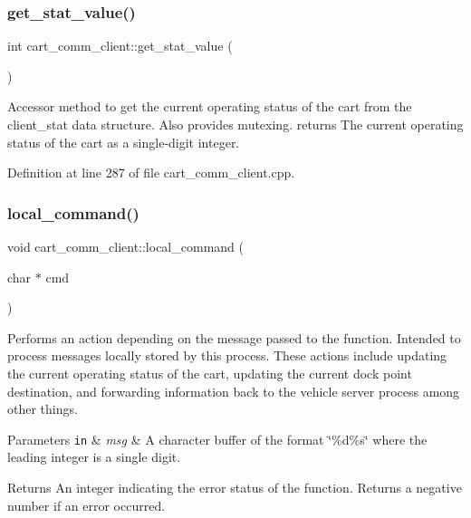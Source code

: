 \subsubsection{\texorpdfstring{get\+\_\+stat\+\_\+value()}{get\_stat\_value()}}
{\footnotesize\ttfamily int cart\+\_\+comm\+\_\+client\+::get\+\_\+stat\+\_\+value (\begin{DoxyParamCaption}{ }\end{DoxyParamCaption})}

Accessor method to get the current operating status of the cart from the client\+\_\+stat data structure. Also provides mutexing. returns The current operating status of the cart as a single-\/digit integer. 

Definition at line 287 of file cart\+\_\+comm\+\_\+client.\+cpp.

\mbox{\label{classcart__comm__client_a2436ebf614302ff2aea8796d8ae6ba47}} 
\subsubsection{\texorpdfstring{local\+\_\+command()}{local\_command()}}
{\footnotesize\ttfamily void cart\+\_\+comm\+\_\+client\+::local\+\_\+command (\begin{DoxyParamCaption}\item[{char $\ast$}]{cmd }\end{DoxyParamCaption})}

Performs an action depending on the message passed to the function. Intended to process messages locally stored by this process. These actions include updating the current operating status of the cart, updating the current dock point destination, and forwarding information back to the vehicle server process among other things. 
\begin{DoxyParams}[1]{Parameters}
\mbox{\tt in}  & {\em msg} & A character buffer of the format \char`\"{}\%d\%s\char`\"{} where the leading integer is a single digit. \\
\hline
\end{DoxyParams}
\begin{DoxyReturn}{Returns}
An integer indicating the error status of the function. Returns a negative number if an error occurred. 
\end{DoxyReturn}


